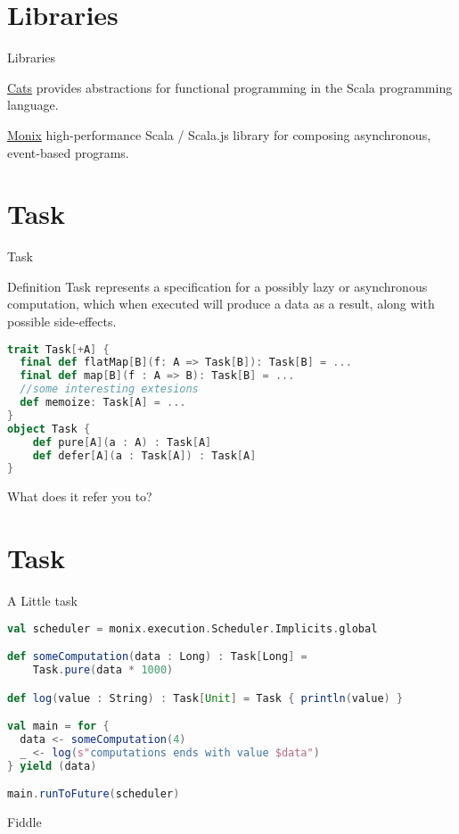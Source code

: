 \documentclass[presentation]{beamer}
\let\oldcite\cite
\renewcommand{\cite}[1]{{\color{blue}\oldcite{#1}}}
\begin{document}
\section{Libraries}
\begin{frame}[fragile]{Libraries}
\begin{block}{\href{https://typelevel.org/cats/}{Cats} \cite{scalacats2017}}
  provides abstractions for functional programming in the Scala programming language.
\end{block}
\begin{block}{\href{https://monix.io/}{Monix}}
  high-performance Scala / Scala.js library for composing asynchronous, event-based programs.
\end{block}
\end{frame}
\section{Task}
\begin{frame}[fragile]{Task}
\begin{block}{Definition}
  Task represents a specification for a possibly lazy or asynchronous computation, which when executed will produce a data as a result, along with possible side-effects.
\end{block}
\begin{lstlisting}[language=Scala]
trait Task[+A] {
  final def flatMap[B](f: A => Task[B]): Task[B] = ...
  final def map[B](f : A => B): Task[B] = ...
  //some interesting extesions
  def memoize: Task[A] = ...
}
object Task {
    def pure[A](a : A) : Task[A]
    def defer[A](a : Task[A]) : Task[A]
}
\end{lstlisting}
\begin{center}
  What does it refer you to?
\end{center}
\end{frame}
\section{Task}
\begin{frame}[fragile]{A Little task}

\begin{lstlisting}[language=Scala]
val scheduler = monix.execution.Scheduler.Implicits.global

def someComputation(data : Long) : Task[Long] = 
    Task.pure(data * 1000)

def log(value : String) : Task[Unit] = Task { println(value) }

val main = for {
  data <- someComputation(4)
  _ <- log(s"computations ends with value $data")
} yield (data)

main.runToFuture(scheduler)
\end{lstlisting}
\begin{center}
Fiddle \hyperlink{https://scalafiddle.io/sf/C4Qon6a/1}{\faExternalLink}
\end{center}
\end{frame}
\end{document}
